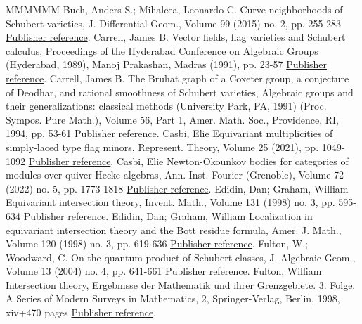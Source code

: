 \documentclass[11pt]{article}
\theoremstyle{definition}
\numberwithin{equation}{section}
\begin{document}
\begin{thebibliography}{MMMMMM}
 Buch, Anders S.; Mihalcea, Leonardo C. Curve neighborhoods of Schubert varieties, J. Differential Geom., Volume 99 (2015) no. 2, pp. 255-283 \href{https://alco.centre-mersenne.org/articles/10.5802/alco.428/#buch.m:nbhds}{Publisher reference}.
 Carrell, James B. Vector fields, flag varieties and Schubert calculus, Proceedings of the Hyderabad Conference on Algebraic Groups (Hyderabad, 1989), Manoj Prakashan, Madras (1991), pp. 23-57 \href{https://alco.centre-mersenne.org/articles/10.5802/alco.428/#carrell:vector}{Publisher reference}.
 Carrell, James B. The Bruhat graph of a Coxeter group, a conjecture of Deodhar, and rational smoothness of Schubert varieties, Algebraic groups and their generalizations: classical methods (University Park, PA, 1991) (Proc. Sympos. Pure Math.), Volume 56, Part 1, Amer. Math. Soc., Providence, RI, 1994, pp. 53-61 \href{https://alco.centre-mersenne.org/articles/10.5802/alco.428/#carrell:bruhat}{Publisher reference}.
 Casbi, Elie Equivariant multiplicities of simply-laced type flag minors, Represent. Theory, Volume 25 (2021), pp. 1049-1092 \href{https://alco.centre-mersenne.org/articles/10.5802/alco.428/#Cas19}{Publisher reference}.
 Casbi, Elie Newton-Okounkov bodies for categories of modules over quiver Hecke algebras, Ann. Inst. Fourier (Grenoble), Volume 72 (2022) no. 5, pp. 1773-1818 \href{https://alco.centre-mersenne.org/articles/10.5802/alco.428/#casbi2019newton}{Publisher reference}.
 Edidin, Dan; Graham, William Equivariant intersection theory, Invent. Math., Volume 131 (1998) no. 3, pp. 595-634 \href{https://alco.centre-mersenne.org/articles/10.5802/alco.428/#edidin.graham:eqchow}{Publisher reference}.
 Edidin, Dan; Graham, William Localization in equivariant intersection theory and the Bott residue formula, Amer. J. Math., Volume 120 (1998) no. 3, pp. 619-636 \href{https://alco.centre-mersenne.org/articles/10.5802/alco.428/#edidin-graham:localization}{Publisher reference}.
 Fulton, W.; Woodward, C. On the quantum product of Schubert classes, J. Algebraic Geom., Volume 13 (2004) no. 4, pp. 641-661 \href{https://alco.centre-mersenne.org/articles/10.5802/alco.428/#fulton.woodward}{Publisher reference}.
 Fulton, William Intersection theory, Ergebnisse der Mathematik und ihrer Grenzgebiete. 3. Folge. A Series of Modern Surveys in Mathematics, 2, Springer-Verlag, Berlin, 1998, xiv+470 pages \href{https://alco.centre-mersenne.org/articles/10.5802/alco.428/#fulton:IT}{Publisher reference}.

\end{thebibliography}
\end{document}
